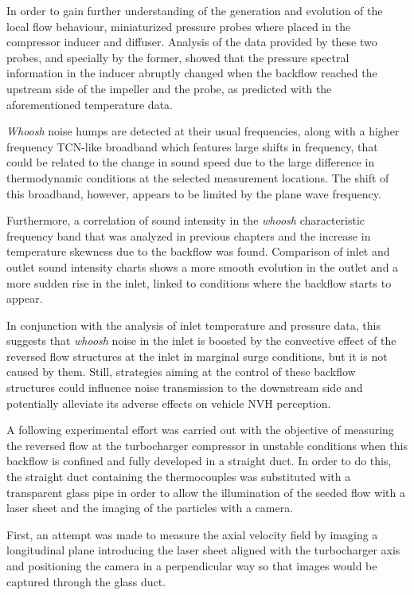 In order to gain further understanding of the generation and evolution of the local flow behaviour, miniaturized pressure probes where placed in the compressor inducer and diffuser. Analysis of the data provided by these two probes, and specially by the former, showed that the pressure spectral information in the inducer abruptly changed when the backflow reached the upstream side of the impeller and the probe, as predicted with the aforementioned temperature data. 

\emph{Whoosh} noise humps are detected at their usual frequencies, along with a higher frequency TCN-like broadband which features large shifts in frequency, that could be related to the change in sound speed due to the large difference in thermodynamic conditions at the selected measurement locations. The shift of this broadband, however, appears to be limited by the plane wave frequency.

Furthermore, a correlation of sound intensity in the \emph{whoosh} characteristic frequency band that was analyzed in previous chapters and the increase in temperature skewness due to the backflow was found. Comparison of inlet and outlet sound intensity charts shows a more smooth evolution in the outlet and a more sudden rise in the inlet, linked to conditions where the backflow starts to appear.

In conjunction with the analysis of inlet temperature and pressure data, this suggests that \emph{whoosh} noise in the inlet is boosted by the convective effect of the reversed flow structures at the inlet in marginal surge conditions, but it is not caused by them. Still, strategies aiming at the control of these backflow structures could influence noise transmission to the downstream side and potentially alleviate its adverse effects on vehicle NVH perception.

A following experimental effort was carried out with the objective of measuring the reversed flow at the turbocharger compressor in unstable conditions when this backflow is confined and fully developed in a straight duct. In order to do this, the straight duct containing the thermocouples was substituted with a transparent glass pipe in order to allow the illumination of the seeded flow with a laser sheet and the imaging of the particles with a camera.

First, an attempt was made to measure the axial velocity field by imaging a longitudinal plane introducing the laser sheet aligned with the turbocharger axis and positioning the camera in a perpendicular way so that images would be captured through the glass duct.

